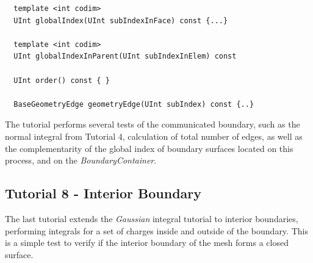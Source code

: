 \begin{mybox}
\begin{lstlisting}
  template <int codim>
  UInt globalIndex(UInt subIndexInFace) const {...}

  template <int codim>
  UInt globalIndexInParent(UInt subIndexInElem) const 

  UInt order() const { }

  BaseGeometryEdge geometryEdge(UInt subIndex) const {..}
\end{lstlisting}
\end{mybox}

\noindent
The tutorial performs several tests of the communicated boundary, such as the normal integral from Tutorial 4, calculation of total number of edges, as well as the complementarity of the global index of boundary surfaces located on this process, and on the \textit{BoundaryContainer}. \\




\subsection{Tutorial 8 - Interior Boundary}

The last tutorial extends the \textit{Gaussian} integral tutorial to interior boundaries, performing integrals for a set of charges inside and outside of the boundary. This is a simple test to verify if the interior boundary of the mesh forms a closed surface.












